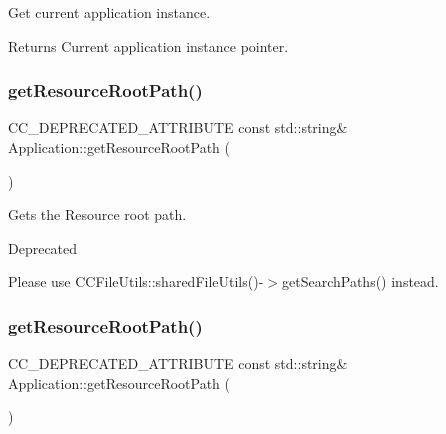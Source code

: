 Get current application instance. 

\begin{DoxyReturn}{Returns}
Current application instance pointer. 
\end{DoxyReturn}
\mbox{\label{classApplication_a669e0584fa243449d87b17bc31d19113}} 
\subsubsection{\texorpdfstring{get\+Resource\+Root\+Path()}{getResourceRootPath()}\hspace{0.1cm}{\footnotesize\ttfamily [1/8]}}
{\footnotesize\ttfamily C\+C\+\_\+\+D\+E\+P\+R\+E\+C\+A\+T\+E\+D\+\_\+\+A\+T\+T\+R\+I\+B\+U\+TE const std\+::string\& Application\+::get\+Resource\+Root\+Path (\begin{DoxyParamCaption}\item[{void}]{ }\end{DoxyParamCaption})}

Gets the Resource root path. \begin{DoxyRefDesc}{Deprecated}
\item[\hyperlink{deprecated__deprecated000132}{Deprecated}]Please use C\+C\+File\+Utils\+::shared\+File\+Utils()-\/$>$get\+Search\+Paths() instead. \end{DoxyRefDesc}
\mbox{\label{classApplication_a669e0584fa243449d87b17bc31d19113}} 
\subsubsection{\texorpdfstring{get\+Resource\+Root\+Path()}{getResourceRootPath()}\hspace{0.1cm}{\footnotesize\ttfamily [2/8]}}
{\footnotesize\ttfamily C\+C\+\_\+\+D\+E\+P\+R\+E\+C\+A\+T\+E\+D\+\_\+\+A\+T\+T\+R\+I\+B\+U\+TE const std\+::string\& Application\+::get\+Resource\+Root\+Path (\begin{DoxyParamCaption}\item[{void}]{ }\end{DoxyParamCaption})}

